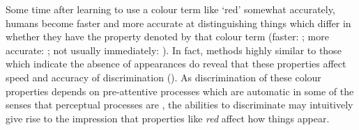 \documentclass[12pt]{extarticle}
\begin{document}
\begin{multicols*}{3}
Some time after learning to use a colour term like ‘red’
somewhat accurately, humans become faster and more accurate at
distinguishing things which differ in whether they have the property
denoted by that colour term (faster: \citealp{Bornstein:1984cb}; more
accurate: \citealp[p.\ 22--7]{Roberson:1999rk}; not usually immediately:
\citealp{Franklin:2005hp}). In fact, methods highly similar to those which
indicate the absence of appearances do reveal that these properties affect
speed and accuracy of discrimination (\citealp{witzel:2014_categorical}).
As discrimination of these colour properties depends on pre-attentive
processes which are automatic in some of the senses that perceptual
processes are \citep{Daoutis:2006ij,clifford_color_2010}, the abilities to
discriminate may intuitively give rise to the impression that properties
like \emph{red} affect how things appear.






\footnotesize


\end{multicols*}
\end{document}
